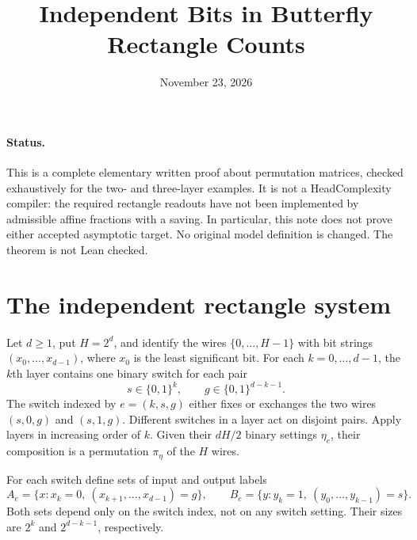 \documentclass[11pt]{article}
\title{Independent Bits in Butterfly Rectangle Counts}
\author{}
\date{November 23, 2026}
\begin{document}
\maketitle

\paragraph{Status.}
This is a complete elementary written proof about permutation matrices,
checked exhaustively for the two- and three-layer examples. It is not a
HeadComplexity compiler: the required rectangle readouts have not been
implemented by admissible affine fractions with a saving. In particular,
this note does not prove either accepted asymptotic target. No original
model definition is changed. The theorem is not Lean checked.

\section{The independent rectangle system}
Let $d\geq1$, put $H=2^d$, and identify the wires $\{0,\ldots,H-1\}$
with bit strings $(x_0,\ldots,x_{d-1})$, where $x_0$ is the least
significant bit. For each $k=0,\ldots,d-1$, the $k$th layer contains
one binary switch for each pair
\[
 s\in\{0,1\}^k,\qquad g\in\{0,1\}^{d-k-1}.
\]
The switch indexed by $e=(k,s,g)$ either fixes or exchanges the two
wires $(s,0,g)$ and $(s,1,g)$. Different switches in a layer act on
disjoint pairs. Apply layers in increasing order of $k$. Given their
$dH/2$ binary settings $\eta_e$, their composition is a permutation
$\pi_\eta$ of the $H$ wires.

For each switch define sets of input and output labels
\[
 A_e=\{x:x_k=0,\ (x_{k+1},\ldots,x_{d-1})=g\},
 \qquad
 B_e=\{y:y_k=1,\ (y_0,\ldots,y_{k-1})=s\}.
\]
Both sets depend only on the switch index, not on any switch setting.
Their sizes are $2^k$ and $2^{d-k-1}$, respectively.
\end{document}
